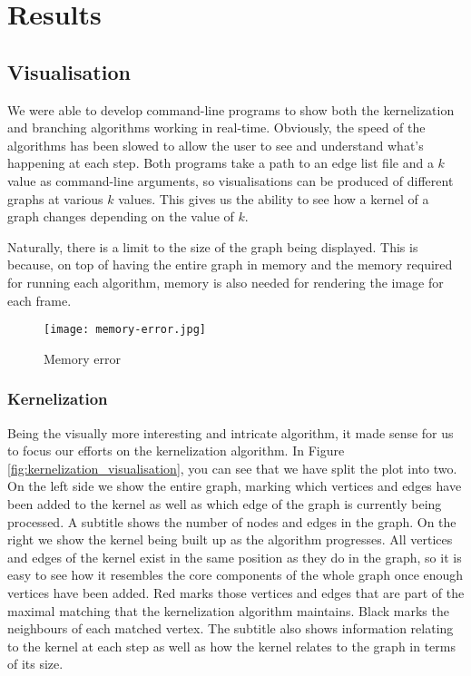 \section{Results}

\subsection{Visualisation}

We were able to develop command-line programs to show both the kernelization
and branching algorithms working in real-time. Obviously, the speed of the
algorithms has been slowed to allow the user to see and understand what's
happening at each step. Both programs take a path to an edge list file and a
\(k\) value as command-line arguments, so visualisations can be produced of
different graphs at various \(k\) values. This gives us the ability to see how
a kernel of a graph changes depending on the value of \(k\).

Naturally, there is a limit to the size of the graph being displayed. This is
because, on top of having the entire graph in memory and the memory required
for running each algorithm, memory is also needed for rendering the image for
each frame.

\begin{figure}[htb]
    \centering
    \texttt{[image: memory-error.jpg]}
    \caption{Memory error}
\end{figure}

\subsubsection{Kernelization}

Being the visually more interesting and intricate algorithm, it made sense for
us to focus our efforts on the kernelization algorithm. In Figure
\ref{fig:kernelization_visualisation}, you can see that we have split the plot
into two. On the left side we show the entire graph, marking which vertices and
edges have been added to the kernel as well as which edge of the graph is
currently being processed. A subtitle shows the number of nodes and edges in
the graph. On the right we show the kernel being built up as the algorithm
progresses. All vertices and edges of the kernel exist in the same position as
they do in the graph, so it is easy to see how it resembles the core components
of the whole graph once enough vertices have been added. Red marks those
vertices and edges that are part of the maximal matching that the kernelization
algorithm maintains. Black marks the neighbours of each matched vertex. The
subtitle also shows information relating to the kernel at each step as well as
how the kernel relates to the graph in terms of its size.

